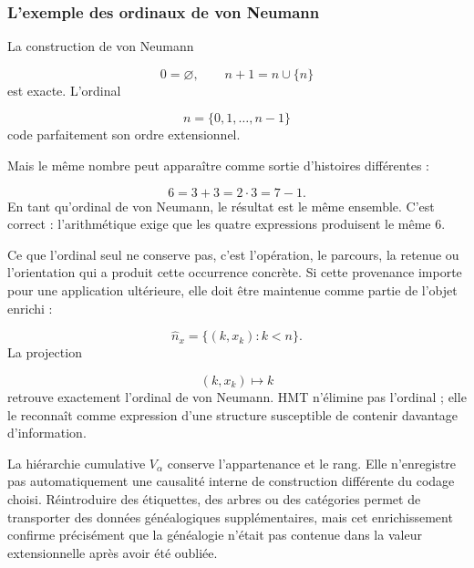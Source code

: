 \subsubsection{L’exemple des ordinaux de von Neumann}
La construction de von Neumann\par
\[
0=\varnothing,
\qquad
n+1=n\cup\{n\}
\]
est exacte. L’ordinal\par
\[
n=\{0,1,\ldots,n-1\}
\]
code parfaitement son ordre extensionnel.\par
{}
Mais le même nombre peut apparaître comme sortie d’histoires différentes :\par
\[
6=3+3=2\cdot3=7-1.
\]
En tant qu’ordinal de von Neumann, le résultat est le même ensemble. C’est correct : l’arithmétique exige que les quatre expressions produisent le même \(6\).\par
Ce que l’ordinal seul ne conserve pas, c’est l’opération, le parcours, la retenue ou l’orientation qui a produit cette occurrence concrète. Si cette provenance importe pour une application ultérieure, elle doit être maintenue comme partie de l’objet enrichi :\par
\[
\widehat n_x
=
\{(k,x_k):k<n\}.
\]
La projection\par
\[
(k,x_k)\longmapsto k
\]
retrouve exactement l’ordinal de von Neumann. HMT n’élimine pas l’ordinal ; elle le reconnaît comme expression d’une structure susceptible de contenir davantage d’information.\par
La hiérarchie cumulative \(V_\alpha\) conserve l’appartenance et le rang. Elle n’enregistre pas automatiquement une causalité interne de construction différente du codage choisi. Réintroduire des étiquettes, des arbres ou des catégories permet de transporter des données généalogiques supplémentaires, mais cet enrichissement confirme précisément que la généalogie n’était pas contenue dans la valeur extensionnelle après avoir été oubliée.\par
{}
